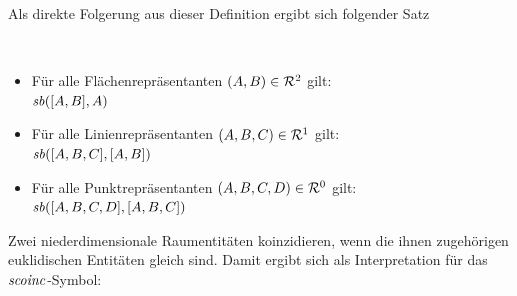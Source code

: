         Als direkte Folgerung aus dieser Definition ergibt sich folgender Satz
        
        \begin{satz}\label{satz:sb-einfacher-fall}\ \vspace{0pt}
            
            \begin{itemize}
                \item Für alle Flächenrepräsentanten $(A,B) \in \mathcal{R}^2$ gilt: \\$\mathit{sb}([A,B],A)$
                \item Für alle Linienrepräsentanten $(A,B,C) \in \mathcal{R}^1$ gilt: \\$\mathit{sb}([A,B,C],[A,B])$
                \item Für alle Punktrepräsentanten $(A,B,C,D) \in \mathcal{R}^0$ gilt: \\$\mathit{sb}([A,B,C,D],[A,B,C])$
            \end{itemize}
        \end{satz}
    
        Zwei niederdimensionale Raumentitäten koinzidieren, wenn die ihnen zugehörigen euklidischen Entitäten gleich sind. Damit ergibt sich als Interpretation für das $\mathit{scoinc}$-Symbol:
    
